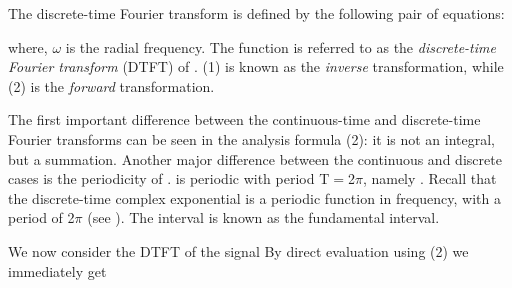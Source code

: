 \documentclass{article}
\begin{document}
\begin{CellGroup}


The discrete-time Fourier transform is defined by the following pair of equations:







where, \(\omega \)  is the radial frequency. The function  is referred to as the {\itshape discrete-time Fourier transform}
(DTFT) of . (1) is known as the {\itshape inverse} transformation, while (2) is the {\itshape forward} transformation.



The first important difference between the  continuous-time and discrete-time Fourier transforms can be seen in the  analysis formula (2): it is
not an integral, but a summation. Another major  difference between the continuous and discrete cases is the periodicity of .  is periodic with period T\(=\)2\(\pi \), namely . Recall
that the discrete-time complex exponential is a periodic function  in frequency, with a period of 2\(\pi \) (see ).
The interval \inlineTFinmath{-\pi \leq \multsp \theta \multsp \leq \pi } is known as the fundamental interval.



\begin{CellGroup}



\end{CellGroup}
We now consider the DTFT of the signal  By direct evaluation using (2) we immediately
get



\begin{CellGroup}


\end{CellGroup}
\end{CellGroup}
\end{document}
